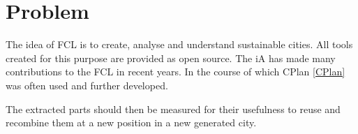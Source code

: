 \chapter{Problem}
The idea of \gls{FCL} is to create, analyse and understand sustainable cities. All tools created for this purpose are provided as open source. The \acrlong{iA} has made many contributions to the \gls{FCL} in recent years. In the course of which CPlan \ref{CPlan} was often used and further developed.





The extracted parts should then be measured for their usefulness to reuse and recombine them at a new position in a new generated city.

